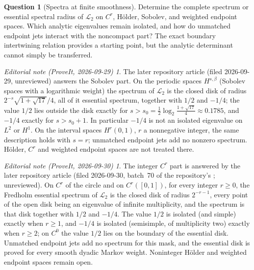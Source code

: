 \documentclass[11pt,a4paper]{article}
\theoremstyle{definition}
\newtheorem{question}[theorem]{Question}
\theoremstyle{remark}
\newtheorem*{ednote}{Editorial note (ProveIt, 2026-09-29)}
\newtheorem*{ednotelater}{Editorial note (ProveIt, 2026-09-30)}
\newcommand{\Lop}{\mathcal L}
\numberwithin{equation}{section}
\begin{document}
\begin{question}[Spectra at finite smoothness]
Determine the complete spectrum or essential spectral radius of $\Lop_2$
on $C^r$, H\"older, Sobolev, and weighted endpoint spaces. Which analytic
eigenvalues remain isolated, and how do unmatched endpoint jets interact
with the noncompact part? The exact boundary intertwining relation provides
a starting point, but the analytic determinant cannot simply be transferred.
\end{question}
\begin{ednote}
The later repository article
(filed 2026-09-29, unreviewed) answers the Sobolev part. On the periodic
spaces $H^{s,\beta}$ (Sobolev spaces with a logarithmic weight) the
spectrum of $\Lop_2$ is the closed disk of radius
$2^{-s}\sqrt{1+\sqrt{17}}/4$, all of it essential spectrum, together with
$1/2$ and $-1/4$; the value $1/2$ lies outside the disk exactly for
$s>s_0=\tfrac12\log_2\frac{1+\sqrt{17}}4\approx0.1785$, and $-1/4$ exactly
for $s>s_0+1$. In particular $-1/4$ is not an isolated eigenvalue on $L^2$
or $H^1$. On the interval spaces $H^r(0,1)$, $r$ a nonnegative integer, the
same description holds with $s=r$; unmatched endpoint jets add no nonzero
spectrum. H\"older, $C^r$ and weighted endpoint spaces are not treated
there.
\end{ednote}
\begin{ednotelater}
The integer $C^r$ part is answered by the later repository article
(filed 2026-09-30, batch~70 of the repository's ;
unreviewed). On $C^r$ of the circle and on $C^r([0,1])$, for every integer
$r\ge0$, the Fredholm essential spectrum of $\Lop_2$ is the closed disk of
radius $2^{-r-1}$, every point of the open disk being an eigenvalue of
infinite multiplicity, and the spectrum is that disk together with $1/2$
and $-1/4$. The value $1/2$ is isolated (and simple) exactly when $r\ge1$,
and $-1/4$ is isolated (semisimple, of multiplicity two) exactly when
$r\ge2$; on $C^0$ the value $1/2$ lies on the boundary of the essential
disk. Unmatched endpoint jets add no spectrum for this mask, and the
essential disk is proved for every smooth dyadic Markov weight. Noninteger H\"older
and weighted endpoint spaces remain open.
\end{ednotelater}
\end{document}
